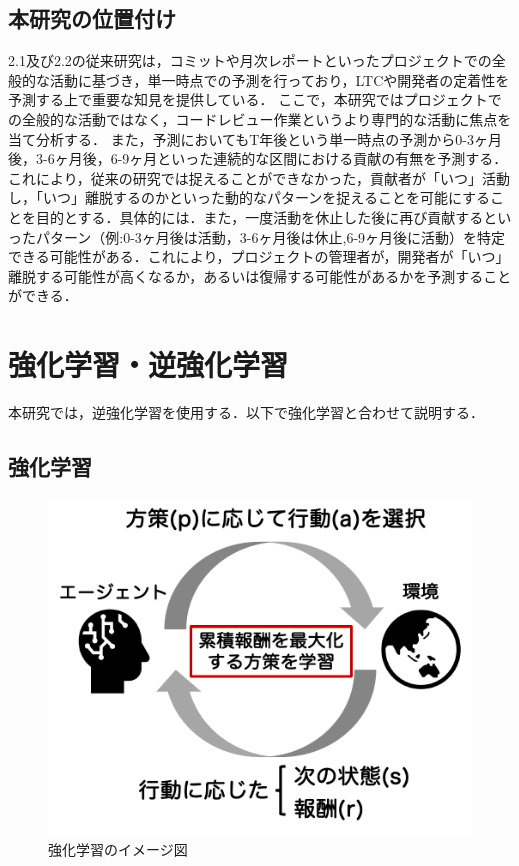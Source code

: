 \documentclass[submit,techrep,noauthor]{ipsj}
\begin{document}
\subsection{本研究の位置付け}
2.1及び2.2の従来研究は，コミットや月次レポートといったプロジェクトでの全般的な活動に基づき，単一時点での予測を行っており，LTCや開発者の定着性を予測する上で重要な知見を提供している．
ここで，本研究ではプロジェクトでの全般的な活動ではなく，コードレビュー作業というより専門的な活動に焦点を当て分析する．
また，予測においてもT年後という単一時点の予測から0-3ヶ月後，3-6ヶ月後，6-9ヶ月といった連続的な区間における貢献の有無を予測する．これにより，従来の研究では捉えることができなかった，貢献者が「いつ」活動し，「いつ」離脱するのかといった動的なパターンを捉えることを可能にすることを目的とする．具体的には．また，一度活動を休止した後に再び貢献するといったパターン（例:0-3ヶ月後は活動，3-6ヶ月後は休止,6-9ヶ月後に活動）を特定できる可能性がある．これにより，プロジェクトの管理者が，開発者が「いつ」離脱する可能性が高くなるか，あるいは復帰する可能性があるかを予測することができる．


\label{sec:format}




\label{config}
\section{強化学習・逆強化学習}
本研究では，逆強化学習を使用する．以下で強化学習と合わせて説明する．
\subsection{強化学習}
\begin{figure}[h]
    \centering
    \includegraphics[width=1.0\linewidth]{./Hashimoto_fig/RL.pdf}
    \caption{強化学習のイメージ図}
    \label{fig:RL}
\end{figure}
\end{document}
